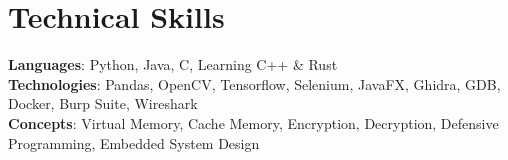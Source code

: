 \section{Technical Skills}
    \begin{itemize}[leftmargin=0.15in, label={}]
	\small{\item{
		\textbf{Languages}{: Python, Java, C, Learning C++ \& Rust} \\
		\textbf{Technologies}{: Pandas, OpenCV, Tensorflow, Selenium, JavaFX, Ghidra, GDB, Docker, Burp Suite, Wireshark} \\
		\textbf{Concepts}{: Virtual Memory, Cache Memory, Encryption, Decryption, Defensive Programming, Embedded System Design}
	}}
    \end{itemize}\vspace{-16pt}

